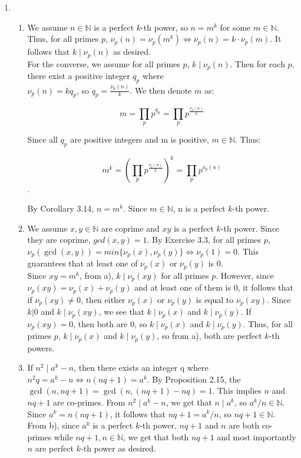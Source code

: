 \documentclass{article}
\begin{document}
\begin{enumerate}[leftmargin=*, label=\arabic*.]
    \item 
    \begin{enumerate}[label=\alph*)]

    \item 
    We assume $n \in \mathbb{N}$ is a perfect $k$-th power, so $n = m^k$ for some $m \in \mathbb{N}$. Thus, for all primes $p$, $\nu_p(n) = \nu_p(m^k) \iff \nu_p(n) = k \cdot \nu_p(m)$. It follows that $k \mid \nu_p(n)$ as desired. \\

    For the converse, we assume for all primes $p$, $k \mid \nu_p(n)$. Then for each $p$, there exist a positive integer $q_p$ where \\ $\nu_p(n) = kq_p$, so $q_p = \frac{\nu_p(n)}{k}$. We then denote $m$ as: 

    $$m =\prod_{p} p^{q_p} =\prod_{p} p^{\frac{\nu_p(n)}{k}}$$

    Since all $q_p$ are positive integers and m is positive, $m \in \mathbb{N}$. Thus:

    $$m^k = (\prod_p p^{\frac{\nu_p(n)}{k}})^k = \prod_p p^{\nu_p(n)}$$.

    By Corollary 3.14, $n = m^k$. Since $m \in \mathbb{N}$, n is a perfect $k$-th power. 

    \item 
    We assume $x,y \in \mathbb{N}$ are coprime and $xy$ is a perfect $k$-th power. Since they are coprime, $gcd(x, y) = 1$. By Exercise 3.3, for all primes $p$, $\nu_p(\gcd(x,y)) = min\{\nu_p(x), \nu_p(y)\} \iff \nu_p(1) = 0$. This guarantees that at least one of $\nu_p(x)$ or $\nu_p(y)$ is 0. \\

    Since $xy = m^k$, from a), $k \mid \nu_p(xy)$ for all primes $p$. However, since $\nu_p(xy) = \nu_p(x) + \nu_p(y)$ and at least one of them is 0, it follows that if $\nu_p(xy) \neq 0$, then either $\nu_p(x)$ or $\nu_p(y)$ is equal to $\nu_p(xy)$. Since $k|0$ and $k \mid \nu_p(xy)$, we see that $k \mid \nu_p(x)$ and $k \mid \nu_p(y)$. If $\nu_p(xy) = 0$, then both are 0, so $k \mid \nu_p(x)$ and $k \mid \nu_p(y)$. Thus, for all primes $p$, $k \mid \nu_p(x)$ and $k \mid \nu_p(y)$, so from a), both are perfect $k$-th powers.\\
    
    \item
    If $n^2 \mid a^k - n$, then there exists an integer q where $n^2q = a^k - n \iff n(nq + 1) = a^k$. By Proposition 2.15, the $\gcd(n, nq + 1) = \gcd(n, (nq + 1) - nq) = 1$. This implies $n$ and $nq + 1$ are co-primes. From $n^2 \mid a^k - n$, we get that $n \mid a^k$, so $a^k / n \in \mathbb{N}$. Since $a^k = n(nq + 1)$, it follows that $nq + 1 = a^k/n$, so $nq + 1 \in \mathbb{N}$.  From b), since $a^k$ is a perfect $k$-th power, $nq + 1$ and $n$ are both co-primes while $nq + 1, n \in \mathbb{N}$, we get that both $nq + 1$ and most importantly $n$ are perfect $k$-th power as desired. 


\end{enumerate}
\end{enumerate}
\end{document}
